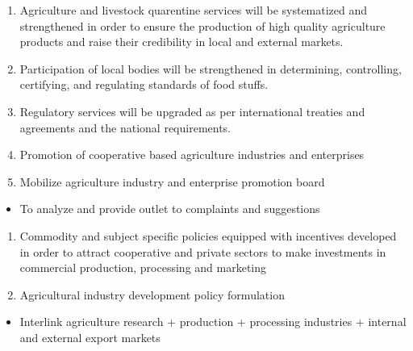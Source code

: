 \documentclass[
]{book}
\providecommand{\tightlist}{%
  \setlength{\itemsep}{0pt}\setlength{\parskip}{0pt}}
\begin{document}
\begin{itemize}
  \begin{enumerate}
  \def\labelenumi{\arabic{enumi}.}
  \setcounter{enumi}{10}
  \tightlist
  \item
    Agriculture and livestock quarentine services will be systematized and strengthened in order to ensure the production of high quality agriculture products and raise their credibility in local and external markets.
  \item
    Participation of local bodies will be strengthened in determining, controlling, certifying, and regulating standards of food stuffs.
  \item
    Regulatory services will be upgraded as per international treaties and agreements and the national requirements.
  \item
    Promotion of cooperative based agriculture industries and enterprises
  \item
    Mobilize agriculture industry and enterprise promotion board
  \end{enumerate}

  \begin{itemize}
  \tightlist
  \item
    To analyze and provide outlet to complaints and suggestions
  \end{itemize}

  \begin{enumerate}
  \def\labelenumi{\arabic{enumi}.}
  \setcounter{enumi}{15}
  \tightlist
  \item
    Commodity and subject specific policies equipped with incentives developed in order to attract cooperative and private sectors to make investments in commercial production, processing and marketing
  \item
    Agricultural industry development policy formulation
  \end{enumerate}

  \begin{itemize}
  \tightlist
  \item
    Interlink agriculture research + production + processing industries + internal and external export markets
  \end{itemize}


\end{itemize}
\end{document}
